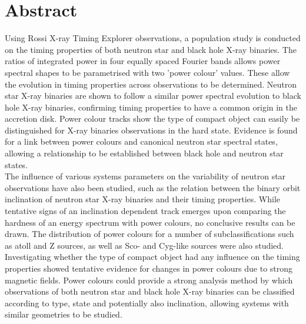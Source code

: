 \begingroup
\let\clearpage\relax
\let\cleardoublepage\relax
\let\cleardoublepage\relax

\chapter*{Abstract}
Using Rossi X-ray Timing Explorer observations, a population study is conducted on the timing properties of both neutron star and black hole X-ray binaries. The ratios of integrated power in four equally spaced Fourier bands allows power spectral shapes to be parametrised with two 'power colour' values. These allow the evolution in timing properties across observations to be determined. Neutron star X-ray binaries are shown to follow a similar power spectral evolution to black hole X-ray binaries, confirming timing properties to have a common origin in the accretion disk. Power colour tracks show the type of compact object can easily be distinguished for X-ray binaries observations in the hard state. Evidence is found for a link between power colours and canonical neutron star spectral states, allowing a relationship to be established between black hole and neutron star states. \\

The influence of various systems parameters on the variability of neutron star observations have also been studied, such as the relation between the binary orbit inclination of neutron star X-ray binaries and their timing properties. While tentative signs of an inclination dependent track emerges upon comparing the hardness of an energy spectrum with power colours, no conclusive results can be drawn. The distribution of power colours for a number of subclassifications such as atoll and Z sources, as well as Sco- and Cyg-like sources were also studied. Investigating whether the type of compact object had any influence on the timing properties showed tentative evidence for changes in power colours due to strong magnetic fields. Power colours could provide a strong analysis method by which observations of both neutron star and black hole X-ray binaries can be classified according to type, state and potentially also inclination, allowing systems with similar geometries to be studied.

\newpage
\let\clearpage\relax
\let\cleardoublepage\relax
\let\cleardoublepage\relax
{}
